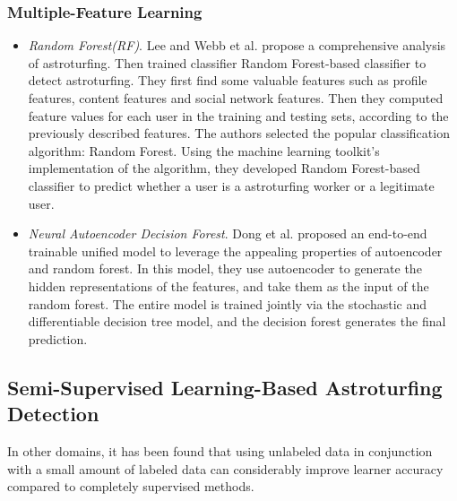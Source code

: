 \documentclass[lettersize,journal]{IEEEtran}
\begin{document}
\subsubsection{Multiple-Feature Learning}
\begin{itemize}
\item \emph{Random Forest(RF)}. 
Lee and Webb et al.\cite{Lee2015CharacterizingAA} propose a comprehensive analysis of astroturfing. Then trained classifier Random Forest-based classifier to detect astroturfing. They first find some valuable features such as profile features, content features and social network features. Then they computed feature values for each user in the training and testing sets, according to the previously described features. The authors selected the popular classification algorithm: Random Forest. Using the machine learning toolkit's implementation of the algorithm, they developed Random Forest-based classifier to predict whether a user is a astroturfing worker or a legitimate user.


 \item \emph{Neural Autoencoder Decision Forest}.
Dong et al.\cite{dong2020opinion} proposed an end-to-end trainable unified model to leverage the appealing properties of autoencoder and random forest. In this model, they use autoencoder to generate the hidden representations of the features, and take them as the input of the random forest. The entire model is trained jointly via the stochastic and differentiable decision tree model, and the decision forest generates the final prediction. 
\end{itemize}



\subsection{Semi-Supervised Learning-Based Astroturfing Detection}

In other domains, it has been found that using unlabeled data in conjunction with a small amount of labeled data can considerably improve learner accuracy compared to completely supervised methods.

\end{document}
